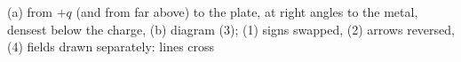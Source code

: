(a) from $+q$ (and from far above) to the plate, at right angles to the metal, densest below the charge, (b) diagram (3); (1) signs swapped, (2) arrows reversed, (4) fields drawn separately: lines cross
